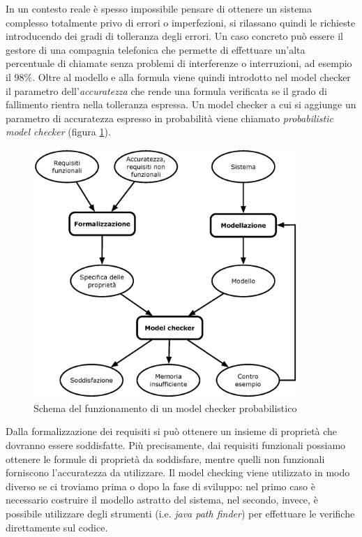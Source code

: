 In un contesto reale è spesso impossibile pensare di ottenere un sistema complesso totalmente privo di errori o imperfezioni, si rilassano quindi le richieste introducendo dei gradi di tolleranza degli errori. Un caso concreto può essere il gestore di una compagnia telefonica che permette di effettuare un'alta percentuale di chiamate senza problemi di interferenze o interruzioni, ad esempio il $98\%$. Oltre al modello e alla formula viene quindi introdotto nel model checker il parametro dell'\emph{accuratezza} che rende una formula verificata se il grado di fallimento rientra nella tolleranza espressa. Un model checker a cui si aggiunge un parametro di accuratezza espresso in probabilità viene chiamato \emph{probabilistic model checker} (figura \ref{fig:probabilisticmodelchecker}).
\begin{figure}[htbp!]
	\begin{center}
		\includegraphics[width=10cm]{Images/pmc.eps}
	\end{center}
\caption{Schema del funzionamento di un model checker probabilistico}
\label{fig:probabilisticmodelchecker}
\end{figure}

Dalla formalizzazione dei requisiti si può ottenere un insieme di proprietà che dovranno essere soddisfatte. Più precisamente, dai requisiti funzionali possiamo ottenere le formule di proprietà da soddisfare, mentre quelli non funzionali forniscono l'accuratezza da utilizzare. Il model checking viene utilizzato in modo diverso se ci troviamo prima o dopo la fase di sviluppo: nel primo caso è necessario costruire il modello astratto del sistema, nel secondo, invece, è possibile utilizzare degli strumenti (i.e. \emph{java path finder}) per effettuare le verifiche direttamente sul codice.

